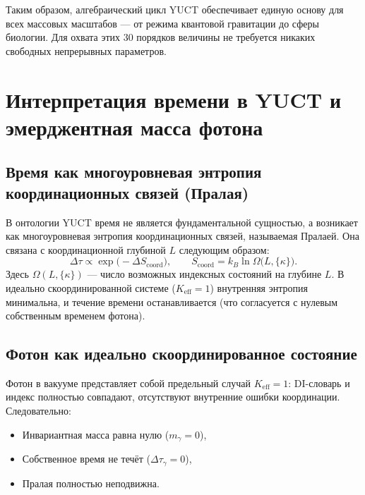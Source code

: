 \documentclass[12pt,a4paper]{article}
\begin{document}
	Таким образом, алгебраический цикл YUCT обеспечивает единую основу для всех массовых масштабов — от режима квантовой гравитации до сферы биологии. Для охвата этих 30 порядков величины не требуется никаких свободных непрерывных параметров.
	
\section{Интерпретация времени в YUCT и эмерджентная масса фотона}
\label{sec:time_photon_ru}

\subsection{Время как многоуровневая энтропия координационных связей (Пралая)}

В онтологии YUCT время не является фундаментальной сущностью, а возникает как многоуровневая энтропия координационных связей, называемая Пралаей. Она связана с координационной глубиной \(L\) следующим образом:
\begin{equation}
	\Delta\tau \propto \exp\bigl(-\Delta S_{\mathrm{coord}}\bigr),\qquad
	S_{\mathrm{coord}} = k_B \ln\Omega\bigl(L,\{\kappa\}\bigr).
\end{equation}
Здесь \(\Omega(L,\{\kappa\})\) — число возможных индексных состояний на глубине \(L\). В идеально скоординированной системе (\(K_{\mathrm{eff}}=1\)) внутренняя энтропия минимальна, и течение времени останавливается (что согласуется с нулевым собственным временем фотона).

\subsection{Фотон как идеально скоординированное состояние}

Фотон в вакууме представляет собой предельный случай \(K_{\mathrm{eff}}=1\): DI-словарь и индекс полностью совпадают, отсутствуют внутренние ошибки координации. Следовательно:
\begin{itemize}
	\item Инвариантная масса равна нулю (\(m_\gamma=0\)),
	\item Собственное время не течёт (\(\Delta\tau_\gamma=0\)),
	\item Пралая полностью неподвижна.
\end{itemize}
\end{document}
